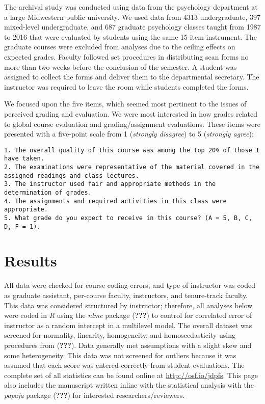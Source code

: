 \documentclass[man]{apa6}
\theoremstyle{definition}
\theoremstyle{definition}
\theoremstyle{definition}
\theoremstyle{remark}
\begin{document}
The archival study was conducted using data from the psychology
department at a large Midwestern public university. We used data from
4313 undergraduate, 397 mixed-level undergraduate, and 687 graduate
psychology classes taught from 1987 to 2016 that were evaluated by
students using the same 15-item instrument. The graduate courses were
excluded from analyses due to the ceiling effects on expected grades.
Faculty followed set procedures in distributing scan forms no more than
two weeks before the conclusion of the semester. A student was assigned
to collect the forms and deliver them to the departmental secretary. The
instructor was required to leave the room while students completed the
forms.

We focused upon the five items, which seemed most pertinent to the
issues of perceived grading and evaluation. We were most interested in
how grades related to global course evaluation and grading/assignment
evaluations. These items were presented with a five-point scale from 1
(\emph{strongly disagree}) to 5 (\emph{strongly agree}):

\begin{verbatim}
1. The overall quality of this course was among the top 20% of those I have taken. 
2. The examinations were representative of the material covered in the assigned readings and class lectures. 
3. The instructor used fair and appropriate methods in the determination of grades. 
4. The assignments and required activities in this class were appropriate. 
5. What grade do you expect to receive in this course? (A = 5, B, C, D, F = 1).
\end{verbatim}

\hypertarget{results}{%
\section{Results}\label{results}}

All data were checked for course coding errors, and type of instructor
was coded as graduate assistant, per-course faculty, instructors, and
tenure-track faculty. This data was considered structured by instructor;
therefore, all analyses below were coded in \emph{R} using the
\emph{nlme} package ({\textbf{???}}) to control for correlated error of
instructor as a random intercept in a multilevel model. The overall
dataset was screened for normality, linearity, homogeneity, and
homoscedasticity using procedures from ({\textbf{???}}). Data generally
met assumptions with a slight skew and some heterogeneity. This data was
not screened for outliers because it was assumed that each score was
entered correctly from student evaluations. The complete set of all
statistics can be found online at \url{http://osf.io/jdpfs}. This page
also includes the manuscript written inline with the statistical
analysis with the \emph{papaja} package ({\textbf{???}}) for interested
researchers/reviewers.
\end{document}
